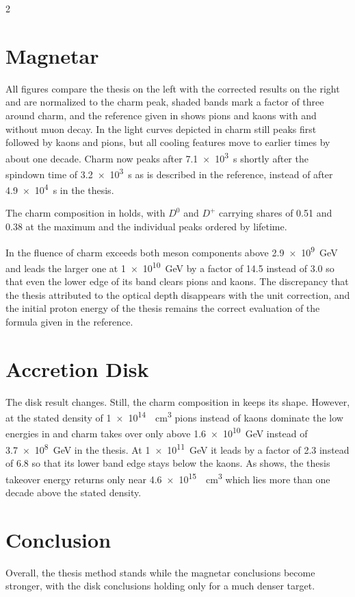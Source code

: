 \begin{multicols}{2}
	\section{Magnetar}

	All figures compare the thesis on the left with the corrected results on the right and are normalized to the charm peak, shaded bands mark
	a factor of three around charm, and the reference \cite{carp2020} given in  shows pions and kaons with and without muon decay.
	In the light curves depicted in  charm still peaks first followed by kaons and pions, but all cooling features move to earlier
	times by about one decade. Charm now peaks after \qty{7.1e3}{\second} shortly after the spindown time of \qty{3.2e3}{\second} as is described in
	the reference, instead of after \qty{4.9e4}{\second} in the thesis.

	The charm composition in  holds, with $D^0$ and $D^+$ carrying shares of \num{0.51} and \num{0.38} at the maximum and
	the individual peaks ordered by lifetime.

	In the fluence of  charm exceeds both meson components above \qty{2.9e9}{\GeV} and leads the larger one at
	\qty{1e10}{\GeV} by a factor of \num{14.5} instead of \num{3.0} so that even the lower edge of its band clears pions and kaons. The
	discrepancy that the thesis attributed to the optical depth disappears with the unit correction, and the initial proton energy of the
	thesis remains the correct evaluation of the formula given in the reference.

	\section{Accretion Disk}

	The disk result changes. Still, the charm composition in  keeps its shape. However, at the stated density of
	\qty{1e14}{\per\cubic\centi\metre} pions instead of kaons dominate the low energies in  and charm
	takes over only above \qty{1.6e10}{\GeV} instead of \qty{3.7e8}{\GeV} in the thesis. At \qty{1e11}{\GeV} it leads by a
	factor of \num{2.3} instead of \num{6.8} so that its lower band edge stays below the kaons. As  shows,
	the thesis takeover energy returns only near \qty{4.6e15}{\per\cubic\centi\metre} which lies more than one decade above
	the stated density.

	\section{Conclusion}

	Overall, the thesis method stands while the magnetar conclusions become stronger, with the disk
	conclusions holding only for a much denser target.

	\vspace{1ex}
	\printbibliography[heading=none]

	\end{multicols}

